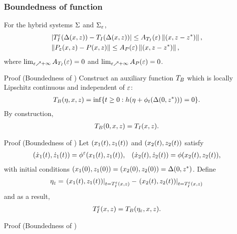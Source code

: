 \begin{frame}[t]
  \frametitle{Boundedness of \TtI{} function}
   {
    \begin{lemma}
      For the hybrid systems $\Sigma$ and $\Sigma_{\varepsilon}$,
      \begin{eqnarray}
        \nonumber
        &| T_{I}^{\varepsilon}(\Delta(x, z)) - T_{I}(\Delta(x, z)) | \leq A_{T_{I}}(\varepsilon) \left\|(x, z - z^{*})\right\|,\\
        &\| P_{\varepsilon}(x, z) - P(x, z) \| \leq A_{P}(\varepsilon) \left\|(x, z - z^{*})\right\|,
      \end{eqnarray}
      where $\lim_{\varepsilon \nearrow +\infty} A_{T_{I}}(\varepsilon) = 0$ and $\lim_{\varepsilon \nearrow +\infty}A_{P}(\varepsilon) = 0$.
    \end{lemma}
  }
   {
    \begin{block}{Proof (Boundedness of \TtI{})}
      Construct an auxiliary \tti{} function $T_{B}$ which is locally Lipschitz
      continuous and independent of $\varepsilon$:
      \begin{align*}
        T_{B}(\eta, x, z) = \inf\{t \geq 0 : h(\eta + \phi_{t}(\Delta(0, z^{*}))) = 0\}.
      \end{align*}
      By construction,
      \begin{align*}
        T_{B}(0, x, z) = T_{I}(x, z).
      \end{align*}
    \end{block}
    }

     {
      \begin{block}{Proof (Boundedness of \TtI{})}
        Let $(x_{1}(t), z_{1}(t))$ and $(x_{2}(t), z_{2}(t))$ satisfy\vspace{-.4em}
        \begin{align*}
          ({\dot {x}}_{1}(t), {\dot {z}}_{1}(t)) = \phi^{\varepsilon}(x_{1}(t), z_{1}(t)), && ({\dot {x}}_{2}(t), {\dot {z}}_{2}(t)) =
          \phi(x_{2}(t), z_{2}(t)),
        \end{align*}
        with initial conditions $(x_{1}(0), z_{1}(0)) = (x_{2}(0), z_{2}(0)) = \Delta(0,
        z^{*})$. Define
        \begin{align*}
          \eta_{\varepsilon} = \left.(x_{1}(t), z_{1}(t))\right|_{t = T_{I}^{\varepsilon}(x, z)} -
          \left.(x_{2}(t), z_{2}(t))\right|_{t = T_{I}^{\varepsilon}(x, z)}
        \end{align*}
        and as a result,\vspace{-.4em}
        \begin{align*}
          T_{I}^{\varepsilon}(x, z) = T_{B}(\eta_{\varepsilon}, x, z).
        \end{align*}

      \end{block}
    }
      
     {
      \begin{block}{Proof (Boundedness of \TtI{})}
      \end{block}
    }
\end{frame}

